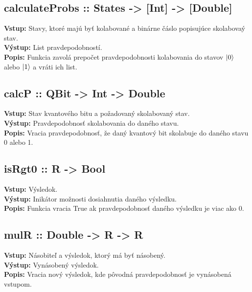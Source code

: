 \subsection*{calculateProbs :: States -> [Int] -> [Double]}
\textbf{Vstup:} Stavy, ktoré majú byť kolabované a binárne čáslo popisujúce
skolabovaý stav.\\
\textbf{Výstup:} List pravdepodobností.\\
\textbf{Popis:} Funkcia zavolá prepočet pravdepodobnosti kolabovania do stavov
\(\ket{0}\) alebo \(\ket{1}\) a vráti ich list.

\subsection*{calcP :: QBit -> Int -> Double}
\textbf{Vstup:} Stav kvantového bitu a požadovaný skolabovaný stav.\\
\textbf{Výstup:} Pravdepodobnosť skolabovania do daného stavu.\\
\textbf{Popis:} Vracia pravdepodobnosť, že daný kvantový bit skolabuje do 
daného stavu 0 alebo 1.

\subsection*{isRgt0 :: R -> Bool}
\textbf{Vstup:} Výsledok.\\
\textbf{Výstup:} Inikátor možnosti dosiahnutia daného výsledku.\\
\textbf{Popis:} Funkcia vracia True ak pravdepodobnosť daného výsledku je 
viac ako 0.

\subsection*{mulR :: Double -> R -> R}
\textbf{Vstup:} Násobiteľ a výsledok, ktorý má byť násobený.\\
\textbf{Výstup:} Vynásobený výsledok.\\
\textbf{Popis:} Vracia nový výsledok, kde pôvodná pravdepodobnosť je vynásobená
vstupom.
